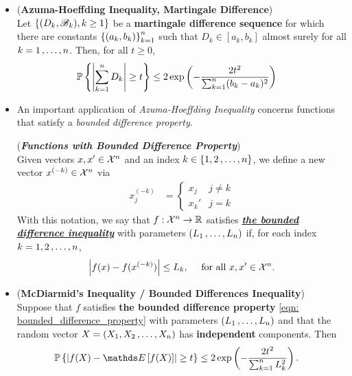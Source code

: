 \documentclass[11pt]{article}
\begin{document}
\begin{itemize}
\item \begin{corollary} (\textbf{Azuma-Hoeffding Inequality, Martingale Difference})\citep{wainwright2019high}\\
Let $\left\{(D_k, {\mathscr B}_k), k \ge 1\right\}$ be a \textbf{martingale difference sequence} for which there are constants $\left\{(a_k, b_k)\right\}^{n}_{k=1}$ such that $D_k \in [a_k, b_k]$ almost surely for all $k = 1 \,{,}\ldots{,}\, n$. Then, for all $t \ge 0$,
\begin{align}
{\mathbb P}\left\{\left\lvert \sum_{k=1}^{n}D_k \right\rvert \ge t \right\} &\le  2 \exp\left(- \frac{2 t^2}{ \sum_{k=1}^{n}(b_k - a_k)^2}\right) \label{ineqn: hoeffding_inequality_martingale}
\end{align}
\end{corollary}

\item An important application of \emph{Azuma-Hoeffding Inequality} concerns functions that satisfy a \emph{bounded difference property}. 
\begin{definition} (\textbf{\emph{Functions with Bounded Difference Property}})\\
Given vectors $x, x' \in {\mathcal X}^n$ and an index $k \in \left\{1, 2 \,{,}\ldots{,}\, n\right\}$, we define a new vector $x^{(-k)} \in {\mathcal X}^n$ via
\begin{align*}
x_j^{(-k)} &= \left\{\begin{array}{cc}
x_j & j \neq k\\
x_k'& j = k
\end{array}
\right.
\end{align*}
With this notation, we say that $f: {\mathcal X}^n \to {\mathbb R}$ satisfies \underline{\textbf{\emph{the bounded difference inequality}}} with parameters $(L_1 \,{,}\ldots{,}\, L_n)$ if, for each index $k = 1, 2 \,{,}\ldots{,}\, n$,
\begin{align}
\left\lvert f(x) - f(x^{(-k)}) \right\rvert \le L_k, \quad\text{ for all }x, x' \in {\mathcal X}^n. \label{eqn: bounded_difference_property}
\end{align}
\end{definition}

\item \begin{corollary} (\textbf{McDiarmid's Inequality / Bounded Differences Inequality})\citep{wainwright2019high}\\
Suppose that $f$ satisfies \textbf{the bounded difference property} \eqref{eqn: bounded_difference_property} with parameters $(L_1 \,{,}\ldots{,}\, L_n)$ and that the random vector $X = (X_1, X_2 \,{,}\ldots{,}\, X_n)$ has \textbf{independent} components. Then
\begin{align}
\bP\set{\abs{f(X) - \E{}{f(X)}} \ge t } &\le  2 \exp\paren{- \frac{2 t^2}{ \sum_{k=1}^{n}L_k^2}}. \label{ineqn: macdiarmid_bounded_difference_inequality}
\end{align}
\end{corollary}
\end{itemize}
\end{document}
